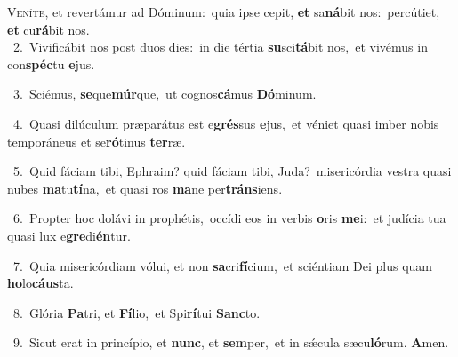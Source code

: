 \lettrine{\initial\textcolor{\initialcolor}{V}}{eníte,} et revertámur ad Dóminum:~\dagger quia ipse cepit, \textbf{et} sa\-\textbf{ná}\-bit nos:~\star percútiet, \textbf{et} cu\-\textbf{rá}\-bit nos.\\
{\numbfont\textcolor{\numbcolor}{~2.}}~Vivificábit nos post duos dies:~\dagger in die tértia \textbf{su}\-sci\-\textbf{tá}\-bit nos,~\star et vivémus in con\-\textbf{spéc}\-tu \textbf{e}\-jus.\par
{\numbfont\textcolor{\numbcolor}{~3.}}~Sciémus, \textbf{se}\-que\-\textbf{múr}\-que,~\star ut cognos\-\textbf{cá}\-mus \textbf{Dó}\-minum.\par
{\numbfont\textcolor{\numbcolor}{~4.}}~Quasi dilúculum præparátus est e\-\textbf{grés}\-sus \textbf{e}\-jus,~\star et véniet quasi imber nobis temporáneus et se\-\textbf{ró}\-tinus \textbf{ter}\-ræ.\par
{\numbfont\textcolor{\numbcolor}{~5.}}~Quid fáciam tibi, Ephraim? quid fáciam tibi, Juda?~\dagger misericórdia vestra quasi nubes \textbf{ma}\-tu\-\textbf{tí}\-na,~\star et quasi ros \textbf{ma}\-ne per\-\textbf{tráns}\-iens.\par
{\numbfont\textcolor{\numbcolor}{~6.}}~Propter hoc dolávi in prophétis,~\dagger occídi eos in verbis \textbf{o}\-ris \textbf{me}\-i:~\star et judícia tua quasi lux e\-\textbf{gre}\-di\-\textbf{én}\-tur.\par
{\numbfont\textcolor{\numbcolor}{~7.}}~Quia misericórdiam vólui, et non \textbf{sa}\-cri\-\textbf{fí}\-cium,~\star et sciéntiam Dei plus quam \textbf{ho}\-lo\-\textbf{cáus}\-ta.\par
{\numbfont\textcolor{\numbcolor}{~8.}}~Glória \textbf{Pa}\-tri, et \textbf{Fí}\-lio,~\star et Spi\-\textbf{rí}\-tui \textbf{Sanc}\-to.\par
{\numbfont\textcolor{\numbcolor}{~9.}}~Sicut erat in princípio, et \textbf{nunc}\-, et \textbf{sem}\-per,~\star et in sǽcula sæcu\-\textbf{ló}\-rum. \textbf{A}\-men.\par
